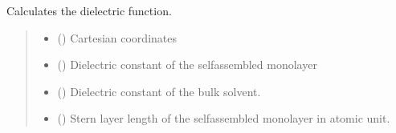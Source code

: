 \documentclass[letterpaper,10pt,english]{sphinxmanual}
\begin{document}

\begin{fulllineitems}
\label{\detokenize{fcdft.solvent:fcdft.solvent.pbe.gen_pbe_solver}}
\pysigstartsignatures
\pysiglinewithargsret
{}
{\sphinxparamcomma {}}
{}
\pysigstopsignatures
\end{fulllineitems}


\begin{fulllineitems}
\label{\detokenize{fcdft.solvent:fcdft.solvent.pbe.make_eps}}
\pysigstartsignatures
\pysiglinewithargsret
{}
{\sphinxparamcomma {}\sphinxparamcomma {}\sphinxparamcomma {}\sphinxparamcomma {}\sphinxparamcomma {}\sphinxparamcomma {}}
{}
\pysigstopsignatures
\sphinxAtStartPar
Calculates the dielectric function.
\begin{quote}\begin{description}
\begin{itemize}
\item {} 
\sphinxAtStartPar
{} () \textendash{} Cartesian coordinates

\item {} 
\sphinxAtStartPar
{} () \textendash{} Dielectric constant of the self\sphinxhyphen{}assembled monolayer

\item {} 
\sphinxAtStartPar
{} () \textendash{} Dielectric constant of the bulk solvent.

\item {} 
\sphinxAtStartPar
{} () \textendash{} Stern layer length of the self\sphinxhyphen{}assembled monolayer in atomic unit.


\end{itemize}
\end{description}
\end{quote}
\end{fulllineitems}
\end{document}
